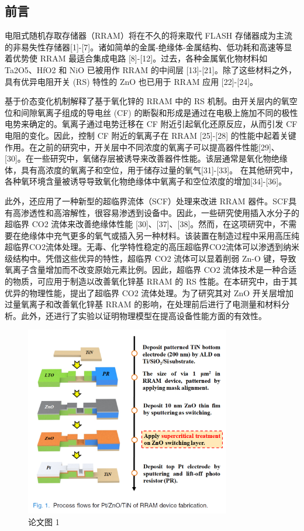 \subsection{前言}

电阻式随机存取存储器（RRAM）将在不久的将来取代 FLASH 存储器成为主流的非易失性存储器[1]-[7]。诸如简单的金属-绝缘体-金属结构、低功耗和高速等显着优势使 RRAM 最适合集成电路 [8]-[12]。过去，各种金属氧化物材料如 Ta2O5、HfO2 和 NiO 已被用作 RRAM 的中间层 [13]-[21]。除了这些材料之外，具有优异电阻开关 (RS) 特性的 ZnO 也已用于 RRAM 应用 [22]-[24]。

基于价态变化机制解释了基于氧化锌的 RRAM 中的 RS 机制。由开关层内的氧空位和间隙氧离子组成的导电丝 (CF) 的断裂和形成是通过在电极上施加不同的极性电势来确定的。氧离子通过电势迁移在 CF 附近引起氧化还原反应，从而引发 CF 电阻的变化。因此，控制 CF 附近的氧离子在 RRAM [25]-[28] 的性能中起着关键作用。在之前的研究中，开关层中不同浓度的氧离子可以提高器件性能[29]、[30]。在一些研究中，氧储存层被诱导来改善器件性能。该层通常是氧化物绝缘体，具有高浓度的氧离子和空位，用于储存过量的氧气[31]-[33]。
在其他研究中，各种氧环境含量被诱导导致氧化物绝缘体中氧离子和空位浓度的增加[34]-[36]。

此外，还应用了一种新型的超临界流体（SCF）处理来改进 RRAM 器件。SCF具有高渗透性和高溶解性，很容易渗透到设备中。因此，一些研究使用插入水分子的超临界 CO2 流体来改善绝缘体性能 [30]、[37]、[38]。然而，在这项研究中，不需要在绝缘体中充气更多的氧气或插入另一种材料。该装置在制造过程中采用高压纯超临界CO2流体处理。无毒、化学特性稳定的高压超临界CO2流体可以渗透到纳米级结构中。凭借这些优异的特性，超临界 CO2 流体可以显着削弱 Zn-O 键，导致氧离子含量增加而不改变原始元素比例。因此，超临界 CO2 流体技术是一种合适的物质，可应用于制造以改善氧化锌基 RRAM 的 RS 性能。在本研究中，由于其优异的物理性能，提出了超临界 CO2 流体处理。为了研究其对 ZnO 开关层增加过量氧离子和改善氧化锌基 RRAM 的影响，在处理前后进行了电测量和材料分析。此外，还进行了实验以证明物理模型在提高设备性能方面的有效性。


\begin{figure}[htb]
\centering 
\includegraphics[width=0.80\textwidth]{img/c1m1.png} 
\caption{论文图 1}
\label{Test}
\end{figure}

